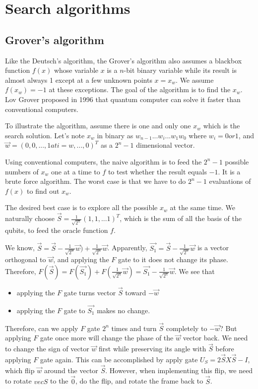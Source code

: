 \documentclass[oneside, letter, 12pt]{book}
\begin{document}
\chapter{Search algorithms}
\section{Grover's algorithm}
Like the Deutsch's algorithm, the Grover's algorithm also assumes a blackbox function $f(x)$ whose variable $x$ is a $n$-bit binary variable while its result is almost always 1 except at a few unknown points $x=x_w$. We assume $f(x_w)=-1$ at these exceptions. The goal of the algorithm is to find the $x_w$. Lov Grover proposed in 1996 that quantum computer can solve it faster than conventional computers.

To illustrate the algorithm, assume there is one and only one $x_w$ which is the search solution. Let's note $x_w$ in binary as $w_{n-1}...w_i...w_1 w_0$ where $w_i = 0 or 1$,
and $\Vec{w} = (0, 0, ..., 1 at i=w, ..., 0)^T$ as a $2^n-1$ dimensional vector.

Using conventional computers, the naive algorithm is to feed the $2^n -1$ possible numbers of $x_w$ one at a time to $f$ to test whether the result equals $-1$. It is a brute force algorithm. The worst case is that we have to do $2^n-1$ evaluations of $f(x)$ to find out $x_w$.

The desired best case is to explore all the possible $x_w$ at the same time. We naturally choose $\vec{S} = \frac 1 {\sqrt{2^n}} (1, 1, ...1)^T$, which is the sum of all the basis of the qubits, to feed the oracle function $f$.

We know, $\vec{S} = \vec{S} - \frac 1 {\sqrt{2^n}} \vec{w}) + \frac 1  {\sqrt{2^n}} \vec{w}$. Apparently, $\vec{S_1}  = \vec{S} - \frac 1 {\sqrt{2^n}} \vec{w}$ is a vector orthogonal to $\vec{w}$, and applying the $F$ gate to it does not change its phase. Therefore, $F(\vec{S}) = F(\vec{S_1}) + F(\frac 1  {\sqrt{2^n}} \vec{w})  = \vec{S_1} - \frac 1 {\sqrt{2^n}} \vec{w}$. We see that 
\begin{itemize}
    \item applying the $F$ gate turns vector $\vec{S}$ toward $-\vec{w}$
    \item applying the $F$ gate to $\vec{S_1}$ makes no change.
\end{itemize}
Therefore, can we apply $F$ gate $2^n$ times and turn $\vec{S}$ completely to $-\vec{w}$? But applying $F$ gate once more will change the phase of the $\vec{w}$ vector back. We need to change the sign of vector $\vec{w}$ first while preserving its angle with $\vec{S}$ before applying $F$ gate again. This can be accomplished by apply gate $U_S = 2 \vec{S}X\vec{S} -I$, which flip $\vec{w}$ around the vector $\vec{S}$. However, when implementing this flip, we need to rotate $vec{S}$ to the $\vec{0}$, do the flip, and rotate the frame back to $\vec{S}$.
\end{document}

